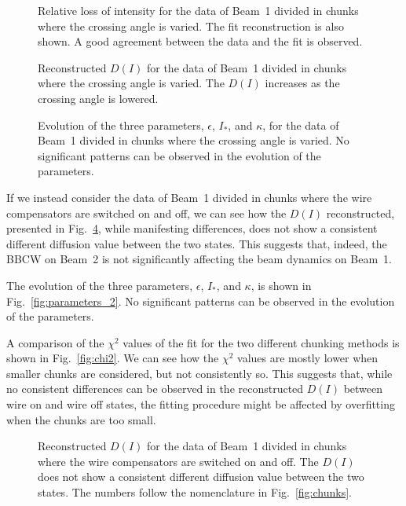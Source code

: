 \begin{figure}[hpt]
    \centering
    \caption{Relative loss of intensity for the data of Beam~1 divided in chunks where the crossing angle is varied. The fit reconstruction is also shown. A good agreement between the data and the fit is observed.}
    \label{fig:reconstruction_1}
\end{figure}

\begin{figure}[hpt]
    \centering
    \caption{Reconstructed $D(I)$ for the data of Beam~1 divided in chunks where the crossing angle is varied. The $D(I)$ increases as the crossing angle is lowered.}
    \label{fig:reconstruction_2}
\end{figure}

\begin{figure}[hpt]
    \centering
    \caption{Evolution of the three parameters, $\epsilon$, $I_\ast$, and $\kappa$, for the data of Beam~1 divided in chunks where the crossing angle is varied. No significant patterns can be observed in the evolution of the parameters.}
    \label{fig:parameters_1}
\end{figure}

If we instead consider the data of Beam~1 divided in chunks where the wire compensators are switched on and off, we can see how the $D(I)$ reconstructed, presented in Fig.~\ref{fig:reconstruction_3}, while manifesting differences, does not show a consistent different diffusion value between the two states. This suggests that, indeed, the BBCW on Beam~2 is not significantly affecting the beam dynamics on Beam~1.

The evolution of the three parameters, $\epsilon$, $I_\ast$, and $\kappa$, is shown in Fig.~\ref{fig:parameters_2}. No significant patterns can be observed in the evolution of the parameters.

A comparison of the $\chi^2$ values of the fit for the two different chunking methods is shown in Fig.~\ref{fig:chi2}. We can see how the $\chi^2$ values are mostly lower when smaller chunks are considered, but not consistently so. This suggests that, while no consistent differences can be observed in the reconstructed $D(I)$ between wire on and wire off states, the fitting procedure might be affected by overfitting when the chunks are too small.

\begin{figure}[hpt]
    \centering
    \caption{Reconstructed $D(I)$ for the data of Beam~1 divided in chunks where the wire compensators are switched on and off. The $D(I)$ does not show a consistent different diffusion value between the two states. The numbers follow the nomenclature in Fig.~\ref{fig:chunks}.}
    \label{fig:reconstruction_3}
\end{figure}


